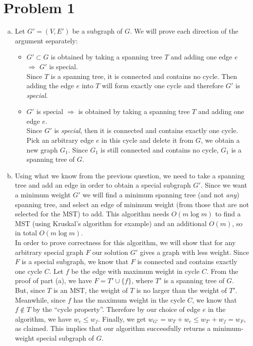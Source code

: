 \documentclass{article}
\begin{document}
\noindent
{}

\section*{Problem 1}
\begin{enumerate}[a)]
	\item Let $G'=(V,E')$ be a subgraph of $G$. We will prove each direction of the argument separately:

		\begin{itemize}
				\item $G'\subset G$ is obtained by taking a spanning tree $T$
and adding one edge $e$ $\Rightarrow$ $G'$ is special.\\
 Since $T$ is a spanning tree, it is connected and contains no cycle. Then
adding the edge $e$ into $T$ will form exactly one cycle and therefore $G'$ is
\emph{special}. 

				\item $G'$ is special $\Rightarrow$ is obtained by taking a
spanning tree $T$ and adding one edge $e$.\\
Since $G'$ is \emph{special}, then it is connected and contains exactly
one cycle. Pick an arbitrary edge $e$ in this cycle and delete it from $G$, we
obtain a new graph $G_1$. Since $G_1$ is still connected and contains no cycle,
$G_1$ is a spanning tree of $G$.
			\end{itemize}

	\item Using  what we know from the previous question, we need to take a
spanning tree and add an edge in order to obtain a special subgraph $G'$. Since
we want a minimum weight $G'$ we will find a minimum spanning
tree (and not \emph{any}) spanning tree, and select an edge of minimum weight
(from those that are not selected for the MST) to add. This algorithm needs
$O(m\log m)$ to find a MST (using Kruskal's algorithm for example) and an
additional $O(m)$, so in total $O(m\log m)$.\\

In order to prove correctness for this algorithm, we will show that for any
arbitrary special graph $F$ our solution $G'$ gives a graph with less weight.
Since $F$ is a special subgraph, we know that $F$ is connected and contains
exactly one cycle $C$. Let $f$ be the edge with maximum weight in cycle $C$.
From the proof of part (a), we have $F=T'\cup\{f\}$, where $T'$ is a spanning
tree of $G$.  But, since $T$ is an MST, the weight of $T$ is no larger than the
weight of $T'$.  Meanwhile, since $f$ has the maximum weight in the cycle $C$,
we know that $f\notin T$ by the ``cycle property''. Therefore by our choice of
edge $e$ in the algorithm, we have $w_e\le w_f$. Finally, we get
$w_{G'}=w_T+w_{e}\le w_{T'}+w_{f}=w_{F}$, as claimed. This implies that our
algorithm successfully returns a minimum-weight special subgraph of $G$.
\end{enumerate}
\end{document}

